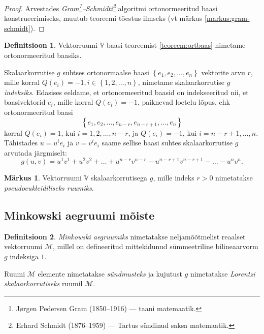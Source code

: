 \documentclass[12pt,a4paper,oneside]{article}
\theoremstyle{plain}
\theoremstyle{definition}
\newtheorem{definitsioon}{Definitsioon}[section]
\newtheorem{markus}{Märkus}[section]
\numberwithin{equation}{section}
\def\V{{\mathbb V}}
\def\M{{\mathcal M}}
\begin{document}
\begin{proof}
Arvestades \textit{Gram\footnote{Jørgen Pedersen Gram (1850--1916) --- 
taani matemaatik.}--Schmidti\footnote{Erhard Schmidt (1876--1959) --- 
Tartus sündinud saksa matemaatik.}} algoritmi ortonormeeritud baasi 
konstrueerimiseks, muutub teoreemi tõestus ilmseks (vt märkus 
\ref{markus:gram-schmidt}).
\end{proof}

\begin{definitsioon}
Vektorruumi $\V$ baasi teoreemist \ref{teoreem:ortbaas} nimetame ortonormeeritud 
baasiks.
\end{definitsioon}

Skalaarkorrutise $g$ suhtses ortonormaalse baasi 
$\left\lbrace e_1, e_2, \dots, e_n \right\rbrace$ vektorite arvu 
$r$, mille korral $Q \left(e_i\right) = -1, i \in 
\left\lbrace 1, 2, \dots, n \right\rbrace$, nimetame skalaarkorrutise 
$g$ \emph{indeksiks}.
Edasises eeldame, et ortonormeeritud baasid on indekseeritud nii, et 
baasivektorid $e_i$, mille korral $Q \left(e_i\right) = -1$, paiknevad 
loetelu lõpus, ehk ortonormeeritud baasi 
\[\left\lbrace e_1, e_2, \dots, e_{n-r}, e_{n-r+1}, 
\dots, e_n \right\rbrace\]
korral $Q \left(e_i\right) = 1$, kui $i = 1, 2, \dots, n-r$, ja 
$Q \left(e_i\right) = -1$, kui $i = n-r+1, \dots, n$. Tähistades 
$u = u^i e_i$ ja $v = v^i e_i$ saame sellise baasi suhtes 
skalaarkorrutise $g$ arvutada järgmiselt:
\[g\left(u, v\right) = u^1 v^1 + u^2 v^2 + \ldots + u^{n-r} v^{n-r} - 
u^{n-r+1} v^{n-r+1} - \ldots - u^n v^n.\]

\begin{markus}
Vektorruumi $\V$ skalaarkorrutisega $g$, mille indeks 
$r > 0$ nimetatakse \emph{pseudoeukleidiliseks ruumiks}.
\end{markus}


\subsection{Minkowski aegruumi mõiste}

\begin{definitsioon}
\emph{Minkowski aegruumiks} nimetatakse neljamõõtmelist reaalset 
vektorruumi $\M$, millel on defineeritud mittekidunud sümmeetriline 
bilineaarvorm $g$ indeksiga $1$.

Ruumi $\M$ elemente nimetatakse \emph{sündmusteks} ja kujutust $g$ 
nimetatakse \emph{Lorentzi skalaarkorrutiseks} ruumil $\M$.
\end{definitsioon}
\end{document}
